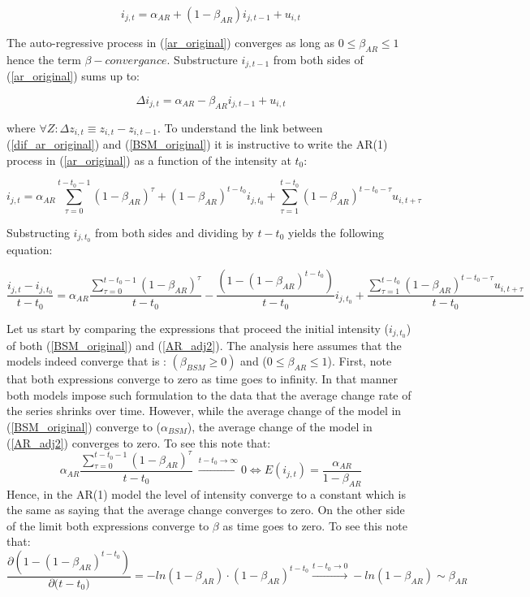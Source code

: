 \documentclass[]{amsart}
\begin{document}
\begin{equation}
i_{j,t} = \alpha_{AR} + (1-\beta_{AR})i_{j,t-1}+u_{i,t}
 \label{ar_original} 
\end{equation}

The auto-regressive process in (\ref{ar_original}) converges as long as $ 0 \leq \beta_{AR} \leq 1$ hence the term $\beta-convergance$. Substructure $i_{j,t-1}$ from both sides of (\ref{ar_original}) sums up to:

\begin{equation}
\Delta i_{j,t} = \alpha_{AR}-\beta_{AR} i_{j,t-1}+u_{i,t}
\label{dif_ar_original}
\end{equation}

where $\forall Z: \Delta z_{i,t} \equiv z_{i,t}-z_{i,t-1}$. To understand the link between (\ref{dif_ar_original}) and (\ref{BSM_original}) it is instructive to write the AR(1) process in (\ref{ar_original}) as a function of the intensity at $t_0$:

\begin{equation}
i_{j,t} = \alpha_{AR}\sum_{\tau = 0}^{t-t_0-1}(1-\beta_{AR})^{\tau}+(1-\beta_{AR})^{t-t_0}i_{j,t_0}+\sum_{\tau=1}^{t-t_0} (1-\beta_{AR})^{t-t_0-\tau}u_{i,t+\tau}
\label{AR_adj1}
\end{equation}

Substructing $i_{j,t_0}$ from both sides and dividing by $t-t_0$ yields the following equation:

\begin{equation}
\frac{i_{j,t}-i_{j,t_0}}{t-t_0} = \alpha_{AR}\frac{\sum_{\tau = 0}^{t-t_0-1}(1-\beta_{AR})^{\tau}}{t-t_0}-\frac{(1-(1-\beta_{AR})^{t-t_0})}{t-t_0}i_{j,t_0}+\frac{\sum_{\tau=1}^{t-t_0} (1-\beta_{AR})^{t-t_0-\tau}u_{i,t+\tau}}{t-t_0}
\label{AR_adj2}
\end{equation}

\bigskip

Let us start by comparing the expressions that proceed the initial intensity ($i_{j,t_0}$) of both (\ref{BSM_original}) and (\ref{AR_adj2}). The analysis here assumes that the models indeed converge that is : $(\beta_{BSM} \geq 0)$ and  ($0 \leq \beta_{AR} \leq 1$). First, note that both expressions converge to zero as time goes to infinity. In that manner both models impose such formulation to the data that the average change rate of the series shrinks over time. However, while the average change of the model in (\ref{BSM_original}) converge to ($\alpha_{BSM}$), the average change of the model in (\ref{AR_adj2}) converges to zero. To see this note that:
$$\alpha_{AR}\frac{\sum_{\tau = 0}^{t-t_0-1}(1-\beta_{AR})^{\tau}}{t-t_0} \ \xrightarrow{t-t_0 \rightarrow \infty} 0  \Leftrightarrow E(i_{j,t})=\frac{\alpha_{AR}}{1-\beta_{AR}}$$ Hence, in the AR(1) model the level of intensity converge to a constant which is the same as saying that the average change converges to zero. On the other side of the limit both expressions converge to $\beta$ as time goes to zero. To see this note that:
\begin{equation}
\frac{\partial (1-(1-\beta_{AR})^{t-t_0})}{\partial {(t-t_0})} = -ln(1-\beta_{AR})\cdot(1-\beta_{AR})^{t-t_0} \xrightarrow{t-t_0 \rightarrow 0} -ln(1-\beta_{AR}) \sim \beta_{AR}
\label{d_lag}
\end{equation}
\end{document}
